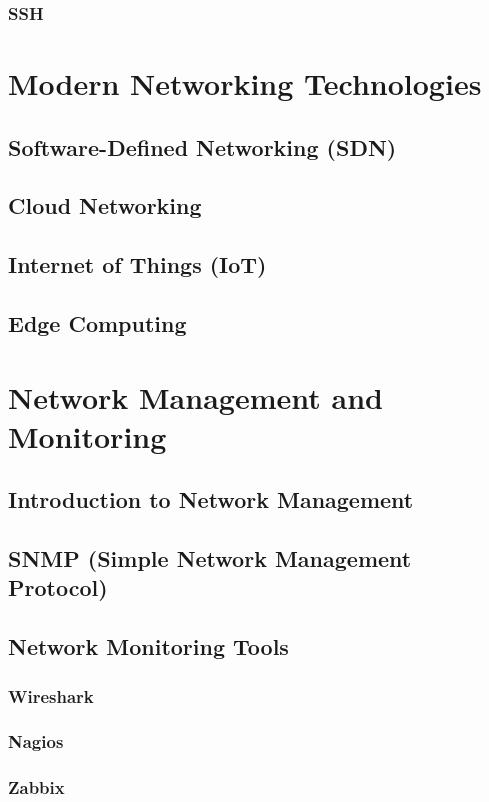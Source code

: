 \documentclass{book}
\begin{document}
        \subsection{SSH}

\chapter{Modern Networking Technologies}
    \section{Software-Defined Networking (SDN)}
    \section{Cloud Networking}
    \section{Internet of Things (IoT)}
    \section{Edge Computing}
    
\chapter{Network Management and Monitoring}
    \section{Introduction to Network Management}
    \section{SNMP (Simple Network Management Protocol)}
    \section{Network Monitoring Tools}
        \subsection{Wireshark}
        \subsection{Nagios}
        \subsection{Zabbix}
        
\end{document}
